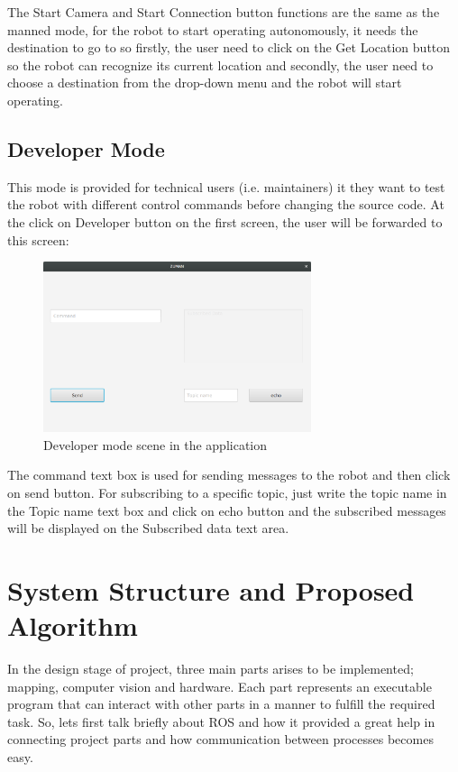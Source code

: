 \documentclass[12pt]{book}
\begin{document}
\noindent The Start Camera and Start Connection button functions are the same as the manned mode, for the robot to start operating autonomously, it needs the destination to go to so firstly, the user need to click on the Get Location button so the robot can recognize its current location and secondly, the user need to choose a destination from the drop-down menu and the robot will start operating.


\section{Developer Mode}
This mode is provided for technical users (i.e. maintainers) it they want to test the robot with different control commands before changing the source code. At the click on Developer button on the first screen, the user will be forwarded to this screen:

\begin{figure}
	\centering
	\includegraphics[width =0.7\textwidth]{Fig/developer-mode.png}
	\caption{Developer mode scene in the application}
	\label{fig:develop-mode}
\end{figure}

\noindent The command text box is used for sending messages to the robot and then click on send button.
For subscribing to a specific topic, just write the topic name in the Topic name text box and click on
echo button and the subscribed messages will be displayed on the Subscribed data text area.





\chapter{System Structure and Proposed Algorithm}

In the design stage of project, three main parts arises to be implemented; mapping, computer vision and hardware. Each part represents an executable program that can interact with other parts in a manner to fulfill the required task. So, lets first talk briefly about ROS and how it provided a great help in connecting project parts and how communication between processes becomes easy.
\end{document}

